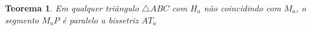 \documentclass[12pt, openright, a4paper, brazil, openany, oneside]{abntex2}
\newtheorem{teo}{Teorema}
\begin{document}
\begin{teo}\label{teo1}
	Em qualquer triângulo $\triangle ABC$ com $H_a$ não coincidindo com $M_a$, o segmento $M_{a}P$ é paralelo a bissetriz $AT_a$
\end{teo}

\end{document}
